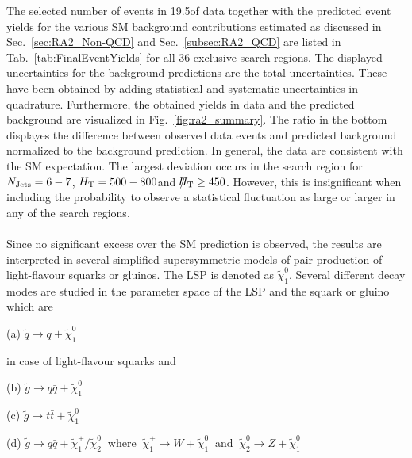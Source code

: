 \begin{table}[!t]
{\begin{tabular}{lll|r|r|r|r|r|r}
    \end{tabular}}
\end{table}

The selected number of events in 19.5\fbinv of data together with the predicted event yields for the various SM background contributions estimated as discussed in Sec.~\ref{sec:RA2_Non-QCD} and Sec.~\ref{subsec:RA2_QCD} are listed in Tab.~\ref{tab:FinalEventYields} for all 36 exclusive search regions. The displayed uncertainties for the background predictions are the total uncertainties. These have been obtained by adding statistical and systematic uncertainties in quadrature. Furthermore, the obtained yields in data and the predicted background are visualized in Fig.~\ref{fig:ra2_summary}. The ratio in the bottom displayes the difference between observed data events and predicted background normalized to the background prediction. In general, the data are consistent with the SM expectation. The largest deviation occurs in the search region for $N_{\text{Jets}} = 6-7$, $H_{\text{T}} = 500-800$\gev and $\slash\mkern-12mu{H}_{\text{T}} \ge 450$\gev. However, this is insignificant when including the probability to observe a statistical fluctuation as large or larger in any of the search regions. \\
\\
Since no significant excess over the SM prediction is observed, the results are interpreted in several simplified supersymmetric models of pair production of light-flavour squarks or gluinos. The LSP is denoted as $\tilde{\chi}_1^0$. Several different decay modes are studied in the parameter space of the LSP and the squark or gluino which are
\begin{description}
\item (a) $\tilde{q} \rightarrow q + \tilde{\chi}_1^0$
\end{description} 
in case of light-flavour squarks and
\begin{description}
\item (b) $\tilde{g} \rightarrow q\bar{q} + \tilde{\chi}_1^0$
\item (c) $\tilde{g} \rightarrow t\bar{t} + \tilde{\chi}_1^0$
\item (d) $\tilde{g} \rightarrow q\bar{q} + \tilde{\chi}_1^{\pm}/\tilde{\chi}_2^0 \;\; \mathrm{where} \;\; \tilde{\chi}_1^{\pm} \rightarrow W + \tilde{\chi}_1^0 \;\; \mathrm{and} \;\; \tilde{\chi}_2^0 \rightarrow Z + \tilde{\chi}_1^0$
\end{description}  
